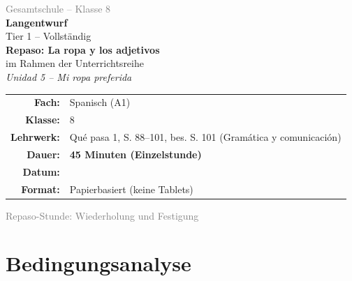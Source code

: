 \documentclass[11pt,a4paper]{article}
\newcommand{\fach}{Spanisch}
\newcommand{\jahrgangsstufe}{8}
\newcommand{\schulart}{Gesamtschule}
\newcommand{\stundenthema}{Repaso: La ropa y los adjetivos}
\newcommand{\reihenthema}{Unidad 5 -- Mi ropa preferida}
\newcommand{\unterrichtsdatum}{\underline{\hspace{3cm}}}
\newcommand{\gerniveau}{A1}
\newcommand{\lehrwerk}{Qué pasa 1}
\newcommand{\lehrwerkseite}{S. 88--101, bes. S. 101 (Gramática y comunicación)}
\begin{document}
\begin{titlepage}
    \centering
    \vspace*{2cm}

    {\large\textcolor{gray}{\schulart{} -- Klasse \jahrgangsstufe}}\\[2cm]

    {\Huge\textcolor{fach}{\textbf{Langentwurf}}}\\[0.5cm]
    {\large Tier 1 -- Vollständig}\\[2cm]

    {\LARGE\textbf{\stundenthema}}\\[0.5cm]
    {\large im Rahmen der Unterrichtsreihe}\\[0.3cm]
    {\Large\textit{\reihenthema}}\\[2cm]

    \begin{tabular}{rl}
        \textbf{Fach:} & \fach{} (\gerniveau) \\[0.3cm]
        \textbf{Klasse:} & \jahrgangsstufe \\[0.3cm]
        \textbf{Lehrwerk:} & \lehrwerk, \lehrwerkseite \\[0.3cm]
        \textbf{Dauer:} & \textbf{45 Minuten (Einzelstunde)} \\[0.3cm]
        \textbf{Datum:} & \unterrichtsdatum \\[0.3cm]
        \textbf{Format:} & Papierbasiert (keine Tablets) \\[0.3cm]
    \end{tabular}

    \vfill

    {\normalsize\textcolor{gray}{Repaso-Stunde: Wiederholung und Festigung}}\\[1cm]

\end{titlepage}

\tableofcontents
\newpage

\section{Bedingungsanalyse}
\end{document}
